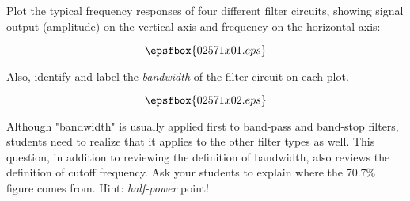 

Plot the typical frequency responses of four different filter circuits, showing signal output (amplitude) on the vertical axis and frequency on the horizontal axis:

$$\epsfbox{02571x01.eps}$$

Also, identify and label the {\it bandwidth} of the filter circuit on each plot.







$$\epsfbox{02571x02.eps}$$







Although "bandwidth" is usually applied first to band-pass and band-stop filters, students need to realize that it applies to the other filter types as well.  This question, in addition to reviewing the definition of bandwidth, also reviews the definition of cutoff frequency.  Ask your students to explain where the 70.7\% figure comes from.  Hint: {\it half-power} point!




